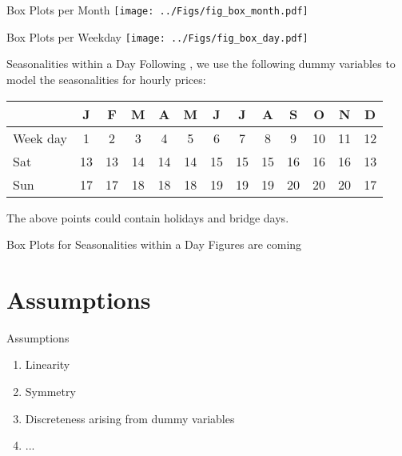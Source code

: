 \documentclass{beamer}
\begin{document}
\begin{frame}{Box Plots per Month}
    \texttt{[image: ../Figs/fig\_box\_month.pdf]}
\end{frame}


\begin{frame}{Box Plots per Weekday}
    \texttt{[image: ../Figs/fig\_box\_day.pdf]}
\end{frame}



\begin{frame}{Seasonalities within a Day}
    Following \cite{SteinErikParaschivSchuerle-2013}, we use the following dummy variables to model the seasonalities for hourly prices:

    \footnotesize
    \begin{tabular}{l|cccccccccccc}
         & J  & F  & M  & A  & M  & J  & J  & A  & S  & O  & N  & D
        \\
        \toprule
        Week day
         & 1  & 2  & 3  & 4  & 5  & 6  & 7  & 8  & 9  & 10 & 11 & 12
        \\
        Sat
         & 13 & 13 & 14 & 14 & 14 & 15 & 15 & 15 & 16 & 16 & 16 & 13
        \\
        Sun
         & 17 & 17 & 18 & 18 & 18 & 19 & 19 & 19 & 20 & 20 & 20 & 17
    \end{tabular}

    \vspace*{0.8cm}
    The above points could contain holidays and bridge days.
\end{frame}


\begin{frame}{Box Plots for Seasonalities within a Day}
    Figures are coming
\end{frame}


\section{Assumptions}

\begin{frame}{Assumptions}
    \begin{enumerate}[label=\roman*.]
        \item Linearity
        \item Symmetry
        \item Discreteness arising from dummy variables
        \item ...
    \end{enumerate}
\end{frame}
\end{document}
